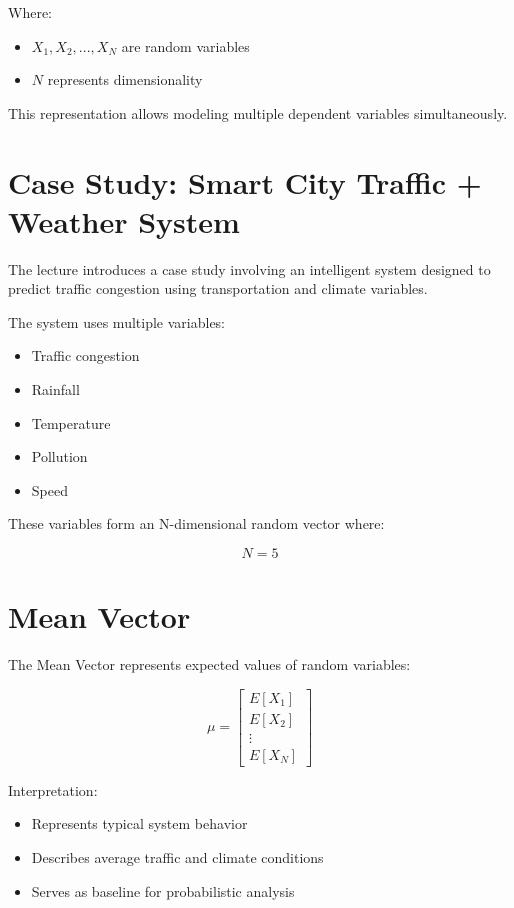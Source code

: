 \documentclass[11pt]{article}
\begin{document}
Where:

\begin{itemize}
\item $X_1, X_2, ..., X_N$ are random variables
\item $N$ represents dimensionality
\end{itemize}

This representation allows modeling multiple dependent variables simultaneously.

\section{Case Study: Smart City Traffic + Weather System}

The lecture introduces a case study involving an intelligent system designed to predict traffic congestion using transportation and climate variables.

The system uses multiple variables:

\begin{itemize}
\item Traffic congestion
\item Rainfall
\item Temperature
\item Pollution
\item Speed
\end{itemize}

These variables form an N-dimensional random vector where:

\[
N = 5
\]

\section{Mean Vector}

The Mean Vector represents expected values of random variables:

\[
\mu =
\begin{bmatrix}
E[X_1] \\
E[X_2] \\
\vdots \\
E[X_N]
\end{bmatrix}
\]

Interpretation:

\begin{itemize}
\item Represents typical system behavior
\item Describes average traffic and climate conditions
\item Serves as baseline for probabilistic analysis
\end{itemize}
\end{document}

